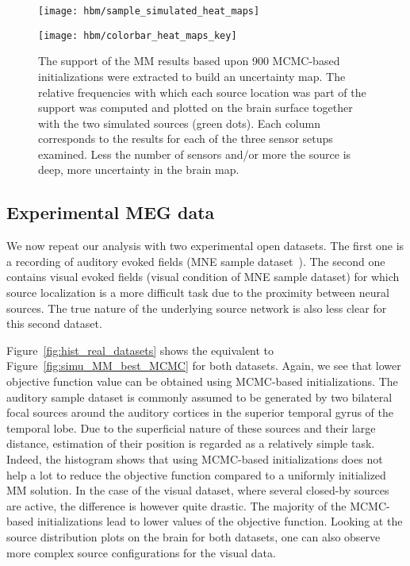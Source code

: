 \begin{figure}[htp]
	\centering
	\begin{minipage}{\linewidth}
		\begin{minipage}{0.9\linewidth}
			\setlength\tabcolsep{0.1pt} %
			\texttt{[image: hbm/sample\_simulated\_heat\_maps]}%
		\end{minipage}
		\begin{minipage}{0.09\linewidth}
				\texttt{[image: hbm/colorbar\_heat\_maps\_key]}%
		\end{minipage}
	\end{minipage}
	\caption{The support of the MM results based upon 900 MCMC-based initializations were extracted to build an uncertainty map. The relative frequencies with which each source location was part of the support was computed and plotted on the brain surface together with the two simulated sources (green dots). Each column corresponds to the results for each of the three sensor setups examined. Less the number of sensors and/or more the source is deep, more uncertainty in the brain map.}
	\label{fig:results_simu_heat_maps}
\end{figure}


\subsection{Experimental MEG data}
We now repeat our analysis with two experimental open datasets. The first one is a recording of auditory evoked fields (MNE sample dataset~\cite{mne-python}). The second one contains visual evoked fields (visual condition of MNE sample dataset) for which source localization is a more difficult task due to the proximity between neural sources. The true nature of the underlying source network is also less clear for this second dataset.

Figure~\ref{fig:hist_real_datasets} shows the equivalent to Figure~\ref{fig:simu_MM_best_MCMC} for both datasets. Again, we see that lower objective function value can be obtained using MCMC-based initializations. The auditory sample dataset is commonly assumed to be generated by two bilateral focal sources around the auditory cortices in the superior temporal gyrus of the temporal lobe. Due to the superficial nature of these sources and their large distance, estimation of their position is regarded as a relatively simple task. Indeed, the histogram shows that using MCMC-based initializations does not help a lot to reduce the objective function compared to a uniformly initialized MM solution. In the case of the visual dataset, where several closed-by sources are active, the difference is however quite drastic. The majority of the MCMC-based initializations lead to lower values of the objective function. Looking at the source distribution plots on the brain for both datasets, one can also observe more complex source configurations for the visual data.

